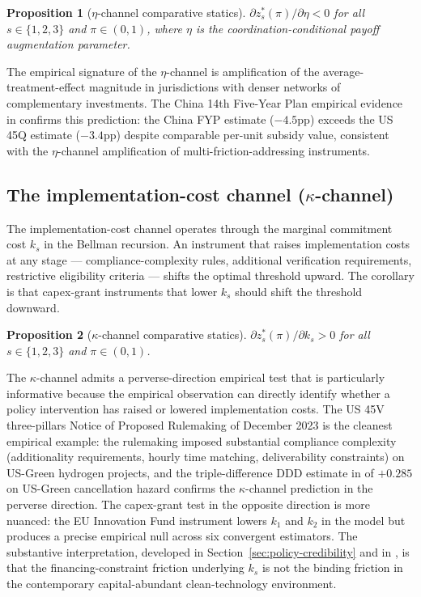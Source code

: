 \documentclass[12pt,a4paper]{article}
\theoremstyle{plain}
\newtheorem{proposition}{Proposition}
\theoremstyle{definition}
\begin{document}
\begin{proposition}[$\eta$-channel comparative statics]
\label{prop:eta-channel}
$\partial z^{*}_{s}(\pi) / \partial \eta < 0$ for all $s \in \{1, 2, 3\}$ and $\pi \in (0, 1)$, where $\eta$ is the coordination-conditional payoff augmentation parameter.
\end{proposition}
\noindent The empirical signature of the $\eta$-channel is amplification of the average-treatment-effect magnitude in jurisdictions with denser networks of complementary investments. The China 14th Five-Year Plan empirical evidence in \cite{saakstra2026paper2} confirms this prediction: the China FYP estimate ($-4.5$pp) exceeds the US 45Q estimate ($-3.4$pp) despite comparable per-unit subsidy value, consistent with the $\eta$-channel amplification of multi-friction-addressing instruments.

\subsection{The implementation-cost channel ($\kappa$-channel)}
\label{sec:channel-kappa}

The implementation-cost channel operates through the marginal commitment cost $k_s$ in the Bellman recursion. An instrument that raises implementation costs at any stage --- compliance-complexity rules, additional verification requirements, restrictive eligibility criteria --- shifts the optimal threshold upward. The corollary is that capex-grant instruments that lower $k_s$ should shift the threshold downward.

\begin{proposition}[$\kappa$-channel comparative statics]
\label{prop:kappa-channel}
$\partial z^{*}_{s}(\pi) / \partial k_s > 0$ for all $s \in \{1, 2, 3\}$ and $\pi \in (0, 1)$.
\end{proposition}
\noindent The $\kappa$-channel admits a perverse-direction empirical test that is particularly informative because the empirical observation can directly identify whether a policy intervention has raised or lowered implementation costs. The US 45V three-pillars Notice of Proposed Rulemaking of December 2023 is the cleanest empirical example: the rulemaking imposed substantial compliance complexity (additionality requirements, hourly time matching, deliverability constraints) on US-Green hydrogen projects, and the triple-difference DDD estimate in \cite{saakstra2026paper2} of $+0.285$ on US-Green cancellation hazard confirms the $\kappa$-channel prediction in the perverse direction. The capex-grant test in the opposite direction is more nuanced: the EU Innovation Fund instrument lowers $k_1$ and $k_2$ in the model but produces a precise empirical null across six convergent estimators. The substantive interpretation, developed in Section~\ref{sec:policy-credibility} and in \cite{saakstra2026paper2}, is that the financing-constraint friction underlying $k_s$ is not the binding friction in the contemporary capital-abundant clean-technology environment.
\end{document}
